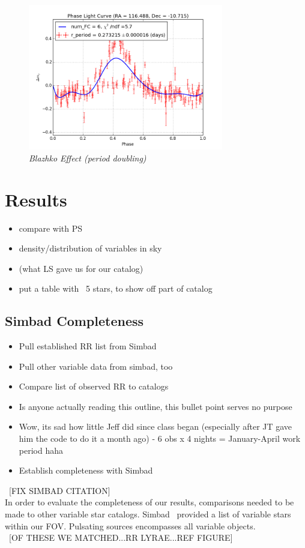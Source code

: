 \documentclass[aps,prb,twocolumn,superscriptaddress]{revtex4-1}
\begin{document}
	\begin{figure}[H]
	 \centering
	 	\includegraphics[width=3.35in]{figures/rPLCneg45E_limit2_grp_116-11_03117.png}
	 \caption{\it \small{Blazhko Effect (period doubling)}}
	 \label{fig:Blazhko}
	\end{figure}
\fi



\section{Results}
\begin{itemize}
	\item{} compare with PS~\cite{PSdata}
	\item{} density/distribution of variables in sky
	\item{} (what LS gave us for our catalog)
	\item{} put a table with ~5 stars, to show off part of catalog
\end{itemize}

\subsection{Simbad Completeness}
	\begin{itemize}
		\item{} Pull established RR list from Simbad
		\item{} Pull other variable data from simbad, too
		\item{} Compare list of observed RR to catalogs
		\item{} Is anyone actually reading this outline, this bullet point serves no purpose
		\item{} Wow, its sad how little Jeff did since class began (especially after JT gave him the code to do it a month ago) - 6 obs x 4 nights = January-April work period haha
		\item{} Establish completeness with Simbad
	\end{itemize}
~[FIX SIMBAD CITATION]\\
In order to evaluate the completeness of our results, comparisons needed to be made to other variable star catalogs.  Simbad~\cite{simbad} provided a list of variable stars within our FOV.  Pulsating sources encompasses all variable objects.  \\
~[OF THESE WE MATCHED...RR LYRAE...REF FIGURE]\\
\end{document}
